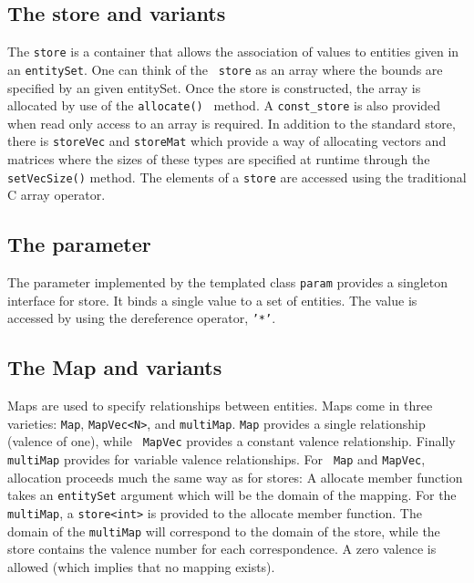 \documentclass{article}
\begin{document}
\subsection{The store and variants}

The {\tt store} is a container that allows the association of values
to entities given in an {\tt entitySet}.  One can think of the {\tt
  store} as an array where the bounds are specified by an given
entitySet.  Once the store is constructed, the array is allocated by
use of the {\tt allocate() } method.  A {\tt const\_store} is also
provided when read only access to an array is required.  In addition
to the standard store, there is {\tt storeVec} and {\tt storeMat}
which provide a way of allocating vectors and matrices where the sizes
of these types are specified at runtime through the {\tt setVecSize()}
method.  The elements of a {\tt store} are accessed using the
traditional C array operator.

\subsection{The parameter}

The parameter implemented by the templated class {\tt param} provides
a singleton interface for store.  It binds a single value to a set of
entities.  The value is accessed by using the dereference operator,
{\tt'*'}.


\subsection{The Map and variants}

Maps are used to specify relationships between entities.  Maps come in
three varieties: {\tt Map}, {\tt MapVec<N>}, and {\tt multiMap}.
{\tt Map} provides a single relationship (valence of one), while {\tt
  MapVec} provides a constant valence relationship.  Finally {\tt
  multiMap} provides for variable valence relationships.  For {\tt
  Map} and {\tt MapVec}, allocation proceeds much the same way as for
stores:  A allocate member function takes an {\tt entitySet} argument
which will be the domain of the mapping.  For the {\tt multiMap}, a
{\tt store<int>} is provided to the allocate member function.  The
domain of the {\tt multiMap} will correspond to the domain of the
store, while the store contains the valence number for each
correspondence.  A zero valence is allowed (which implies that no
mapping exists).


\end{document}
